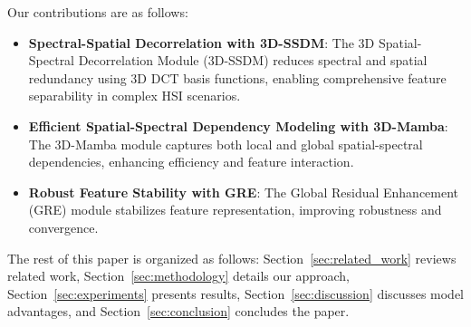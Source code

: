 Our contributions are as follows:
\begin{itemize}
    \item \textbf{Spectral-Spatial Decorrelation with 3D-SSDM}: The 3D Spatial-Spectral Decorrelation Module (3D-SSDM) reduces spectral and spatial redundancy using 3D DCT basis functions, enabling comprehensive feature separability in complex HSI scenarios.
    \item \textbf{Efficient Spatial-Spectral Dependency Modeling with 3D-Mamba}: The 3D-Mamba module captures both local and global spatial-spectral dependencies, enhancing efficiency and feature interaction.
    \item \textbf{Robust Feature Stability with GRE}: The Global Residual Enhancement (GRE) module stabilizes feature representation, improving robustness and convergence.
\end{itemize}

The rest of this paper is organized as follows: Section~\ref{sec:related_work} reviews related work, Section~\ref{sec:methodology} details our approach, Section~\ref{sec:experiments} presents results, Section~\ref{sec:discussion} discusses model advantages, and Section~\ref{sec:conclusion} concludes the paper.





